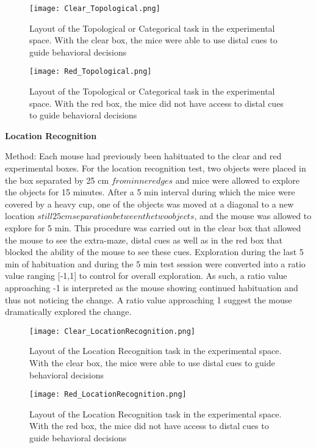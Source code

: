 \documentclass{article}
\begin{document}
\begin{figure}[h!]
\centering
\texttt{[image: Clear\_Topological.png]}
\caption{Layout of the Topological or Categorical task in the experimental space. With the clear box, the mice were able to use distal cues to guide behavioral decisions}
\label{fig:Topological}
\end{figure}

\begin{figure}[h!]
\centering
\texttt{[image: Red\_Topological.png]}
\caption{Layout of the Topological or Categorical task in the experimental space. With the red box, the mice did not have access to distal cues to guide behavioral decisions}
\label{fig:Topological}
\end{figure}

\textbf{Location Recognition}

Method:
Each mouse had previously been habituated to the clear and red experimental boxes. For the location recognition test, two objects were placed in the box separated by 25 cm \(from inner edges\) and mice were allowed to explore the objects for 15 minutes. After a 5 min interval during which the mice were covered by a heavy cup, one of the objects was moved at a diagonal to a new location \(still 25 cm separation between the two objects\), and the mouse was allowed to explore for 5 min. This procedure was carried out in the clear box that allowed the mouse to see the extra-maze, distal cues as well as in the red box that blocked the ability of the mouse to see these cues. Exploration during the last 5 min of habituation and during the 5 min test session were converted into a ratio value ranging [-1,1] to control for overall exploration. As such, a ratio value approaching -1 is interpreted as the mouse showing continued habituation and thus not noticing the change. A ratio value approaching 1 suggest the mouse dramatically explored the change.

\begin{figure}[h!]
\centering
\texttt{[image: Clear\_LocationRecognition.png]}
\caption{Layout of the Location Recognition task in the experimental space. With the clear box, the mice were able to use distal cues to guide behavioral decisions}
\label{fig:LocationRecognition}
\end{figure}

\begin{figure}[h!]
\centering
\texttt{[image: Red\_LocationRecognition.png]}
\caption{Layout of the Location Recognition task in the experimental space. With the red box, the mice did not have access to distal cues to guide behavioral decisions}
\label{fig:LocationRecognition}
\end{figure}
\end{document}
